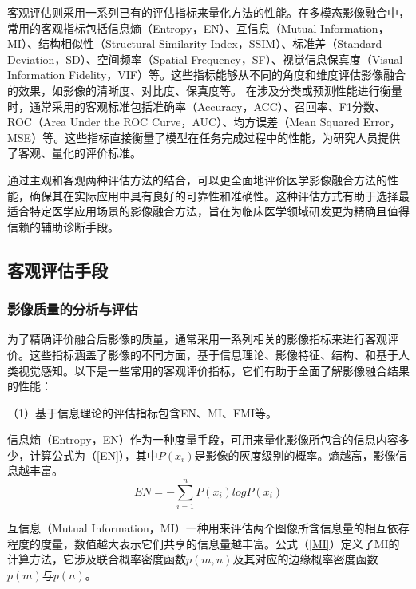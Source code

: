 客观评估则采用一系列已有的评估指标来量化方法的性能。在多模态影像融合中，常用的客观指标包括信息熵（Entropy，EN）\cite{roberts2008assessment}、互信息（Mutual Information，MI）\cite{qu2002information}、结构相似性（Structural Similarity Index，SSIM）\cite{wang2004image}、标准差（Standard Deviation，SD）\cite{shi2005wavelet}、空间频率（Spatial Frequency，SF）\cite{eskicioglu1995image}、视觉信息保真度（Visual Information Fidelity，VIF）\cite{han2013new}等。这些指标能够从不同的角度和维度评估影像融合的效果，如影像的清晰度、对比度、保真度等。
在涉及分类或预测性能进行衡量时，通常采用的客观标准包括准确率（Accuracy，ACC）、召回率、F1分数、ROC（Area Under the ROC Curve，AUC）、均方误差（Mean Squared Error，MSE）等。这些指标直接衡量了模型在任务完成过程中的性能，为研究人员提供了客观、量化的评价标准。

通过主观和客观两种评估方法的结合，可以更全面地评价医学影像融合方法的性能，确保其在实际应用中具有良好的可靠性和准确性。这种评估方式有助于选择最适合特定医学应用场景的影像融合方法，旨在为临床医学领域研发更为精确且值得信赖的辅助诊断手段。


\subsection{客观评估手段}
\subsubsection{影像质量的分析与评估}
为了精确评价融合后影像的质量，通常采用一系列相关的影像指标来进行客观评价。这些指标涵盖了影像的不同方面，基于信息理论、影像特征、结构、和基于人类视觉感知\cite{han2013new}。以下是一些常用的客观评价指标，它们有助于全面了解影像融合结果的性能：

（1）基于信息理论的评估指标包含EN\cite{roberts2008assessment}、MI\cite{qu2002information}、FMI\cite{haghighat2011non}等。

信息熵（Entropy，EN）作为一种度量手段，可用来量化影像所包含的信息内容多少，计算公式为（\ref{EN}），其中$P(x_i)$是影像的灰度级别的概率。熵越高，影像信息越丰富\cite{roberts2008assessment}。
\begin{equation}\label{EN}
EN=-\sum_{i=1}^nP(x_i)logP(x_i)
\end{equation}

互信息（Mutual Information，MI）一种用来评估两个图像所含信息量的相互依存程度的度量，数值越大表示它们共享的信息量越丰富\cite{qu2002information}。公式（\ref{MI}）定义了MI的计算方法，它涉及联合概率密度函数$p(m, n)$及其对应的边缘概率密度函数$p(m)$与$p(n)$。

